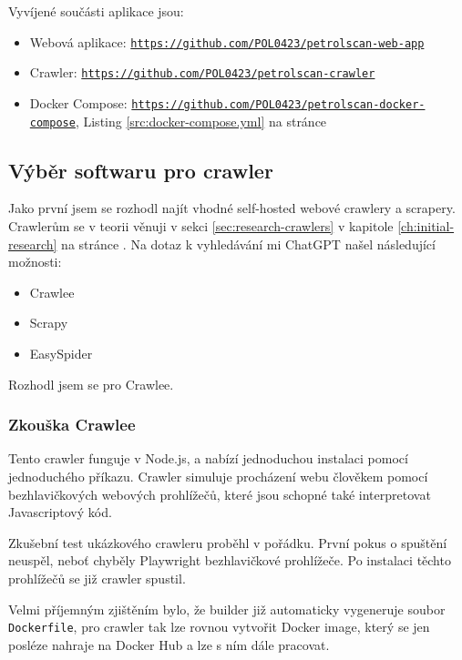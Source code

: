 Vyvíjené součásti aplikace jsou:

\begin{itemize}
    \item Webová aplikace:
        \texttt{\url{https://github.com/POL0423/petrolscan-web-app}}
    \item Crawler:
        \texttt{\url{https://github.com/POL0423/petrolscan-crawler}}
    \item Docker Compose:
        \texttt{\url{https://github.com/POL0423/petrolscan-docker-compose}},
        Listing \ref{src:docker-compose.yml} na stránce
        \pageref{src:docker-compose.yml}
\end{itemize}

\subsection{Výběr softwaru pro crawler}
\label{sec:crawler-solutions}

Jako první jsem se rozhodl najít vhodné self-hosted webové crawlery
a scrapery. Crawlerům se v teorii věnuji v sekci \ref{sec:research-crawlers}
v kapitole \ref{ch:initial-research}
na stránce \pageref{sec:research-crawlers}. Na dotaz k vyhledávání
mi ChatGPT \cite{givNscvAOqB1nMpq} %
našel následující možnosti:

\begin{itemize}
    \item Crawlee
    \item Scrapy
    \item EasySpider
\end{itemize}

Rozhodl jsem se pro Crawlee.

\subsubsection{Zkouška Crawlee}
\label{sec:crawlee-trial}

Tento crawler funguje v Node.js, a nabízí jednoduchou instalaci pomocí
jednoduchého příkazu. Crawler simuluje procházení webu člověkem pomocí
bezhlavičkových webových prohlížečů, které jsou schopné také interpretovat
Javascriptový kód.

Zkušební test ukázkového crawleru proběhl v pořádku.
První pokus o spuštění neuspěl, neboť chyběly Playwright bezhlavičkové
prohlížeče. Po instalaci těchto prohlížečů se již crawler spustil.

Velmi příjemným zjištěním bylo, že builder již automaticky vygeneruje
soubor \texttt{Dockerfile}, pro crawler tak lze rovnou vytvořit
Docker image, který se jen posléze nahraje na Docker Hub a lze s ním
dále pracovat.


